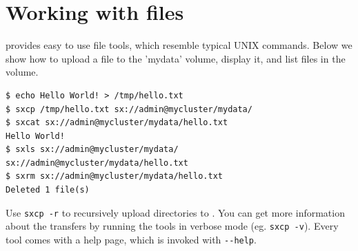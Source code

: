 \section*{Working with files}
\SX provides easy to use file tools, which resemble typical UNIX commands.
Below we show how to upload a file to the 'mydata' volume, display it,
and list files in the volume.

\small
\begin{lstlisting}
$ echo Hello World! > /tmp/hello.txt
$ sxcp /tmp/hello.txt sx://admin@mycluster/mydata/
$ sxcat sx://admin@mycluster/mydata/hello.txt
Hello World!
$ sxls sx://admin@mycluster/mydata/
sx://admin@mycluster/mydata/hello.txt
$ sxrm sx://admin@mycluster/mydata/hello.txt
Deleted 1 file(s)
\end{lstlisting}
\LARGE
Use \verb+sxcp -r+ to recursively upload directories to \SX. You can
get more information about the transfers by running the tools in verbose
mode (eg. \verb+sxcp -v+). Every tool comes with a help page, which is
invoked with \verb+--help+.
